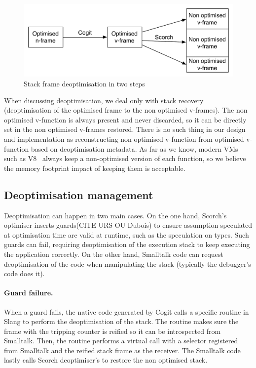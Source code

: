 \documentclass[a4paper,12pt,twoside]{../includes/ThesisStyle}
\begin{document}
\begin{figure}[h!]
    \begin{center}
        \includegraphics[width=0.8\linewidth]{SFDeoptimisation}
        \caption{Stack frame deoptimisation in two steps}
        \label{fig:SFDeoptimisation}
    \end{center}
\end{figure}

When discussing deoptimisation, we deal only with stack recovery (deoptimisation of the optimised frame to the non optimised v-frames). The non optimised v-function is always present and never discarded, so it can be directly set in the non optimised v-frames restored. There is no such thing in our design and implementation as reconstructing non optimised v-function from optimised v-function based on deoptimisation metadata. As far as we know, modern VMs such as V8~\cite{V8} always keep a non-optimised version of each function, so we believe the memory footprint impact of keeping them is acceptable.

\subsection{Deoptimisation management}

Deoptimisation can happen in two main cases. On the one hand, Scorch's optimiser inserts guards(CITE URS OU Dubois) to ensure assumption speculated at optimisation time are valid at runtime, such as the speculation on types. Such guards can fail, requiring deoptimisation of the execution stack to keep executing the application correctly. On the other hand, Smalltalk code can request deoptimisation of the code when manipulating the stack (typically the debugger's code does it).

\paragraph{Guard failure.} When a guard fails, the native code generated by Cogit calls a specific routine in Slang to perform the deoptimisation of the stack. The routine makes sure the frame with the tripping counter is reified so it can be introspected from Smalltalk. Then, the routine performs a virtual call with a selector registered from Smalltalk and the reified stack frame as the receiver. The Smalltalk code lastly calls Scorch deoptimiser's to restore the non optimised stack.
\end{document}
